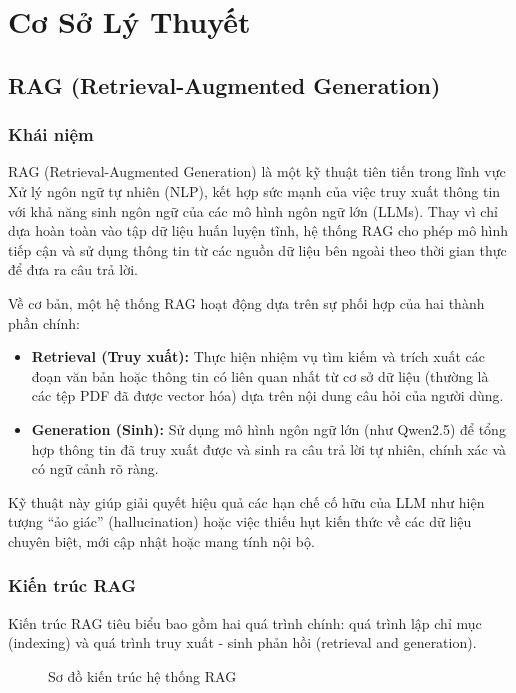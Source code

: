 \documentclass[conference]{IEEEtran}
\begin{document}
\section{Cơ Sở Lý Thuyết}

\subsection{RAG (Retrieval-Augmented Generation)}

\subsubsection{Khái niệm}
RAG (Retrieval-Augmented Generation) là một kỹ thuật tiên tiến trong lĩnh vực Xử lý ngôn ngữ tự nhiên (NLP), kết hợp sức mạnh của việc truy xuất thông tin với khả năng sinh ngôn ngữ của các mô hình ngôn ngữ lớn (LLMs). Thay vì chỉ dựa hoàn toàn vào tập dữ liệu huấn luyện tĩnh, hệ thống RAG cho phép mô hình tiếp cận và sử dụng thông tin từ các nguồn dữ liệu bên ngoài theo thời gian thực để đưa ra câu trả lời.

Về cơ bản, một hệ thống RAG hoạt động dựa trên sự phối hợp của hai thành phần chính:
\begin{itemize}
  \item \textbf{Retrieval (Truy xuất):} Thực hiện nhiệm vụ tìm kiếm và trích xuất các đoạn văn bản hoặc thông tin có liên quan nhất từ cơ sở dữ liệu (thường là các tệp PDF đã được vector hóa) dựa trên nội dung câu hỏi của người dùng.
  \item \textbf{Generation (Sinh):} Sử dụng mô hình ngôn ngữ lớn (như Qwen2.5) để tổng hợp thông tin đã truy xuất được và sinh ra câu trả lời tự nhiên, chính xác và có ngữ cảnh rõ ràng.
\end{itemize}

Kỹ thuật này giúp giải quyết hiệu quả các hạn chế cố hữu của LLM như hiện tượng ``ảo giác'' (hallucination) hoặc việc thiếu hụt kiến thức về các dữ liệu chuyên biệt, mới cập nhật hoặc mang tính nội bộ.

\subsubsection{Kiến trúc RAG}
Kiến trúc RAG tiêu biểu bao gồm hai quá trình chính: quá trình lập chỉ mục (indexing) và quá trình truy xuất - sinh phản hồi (retrieval and generation).

\begin{figure}[h]
  \centering
  \caption{Sơ đồ kiến trúc hệ thống RAG}
  \label{fig:rag}
\end{figure}
\end{document}

